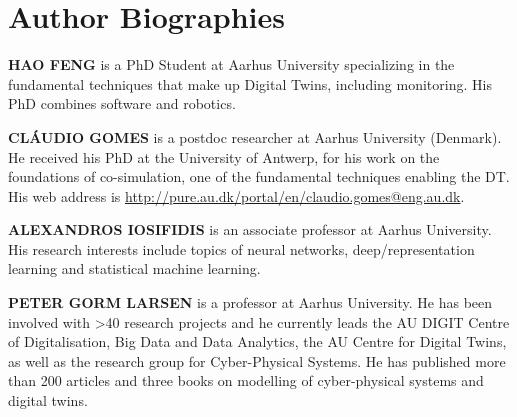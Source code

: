 \section*{Author Biographies}

\textbf{\uppercase{Hao Feng}} is a PhD Student at Aarhus University specializing in the fundamental techniques that make up Digital Twins, including monitoring. His PhD combines software and robotics.

\textbf{\uppercase{CLÁUDIO GOMES}} is a postdoc researcher at Aarhus University (Denmark). He received his PhD at the University of Antwerp, for his work on the foundations of co-simulation, one of the fundamental techniques enabling the DT. His web address is \url{ http://pure.au.dk/portal/en/claudio.gomes@eng.au.dk}.


\textbf{\uppercase{Alexandros Iosifidis}} is an associate professor at Aarhus University.  His research interests include topics of neural networks, deep/representation learning and statistical machine learning.


\textbf{\uppercase{Peter Gorm Larsen}} is a professor at Aarhus University.
He has been involved with >40 research projects and he currently leads the AU DIGIT Centre of Digitalisation, Big Data and Data Analytics, the AU Centre for Digital Twins, as well as the research group for Cyber-Physical Systems.
He has published more than 200 articles and three books on modelling of cyber-physical systems and digital twins.
